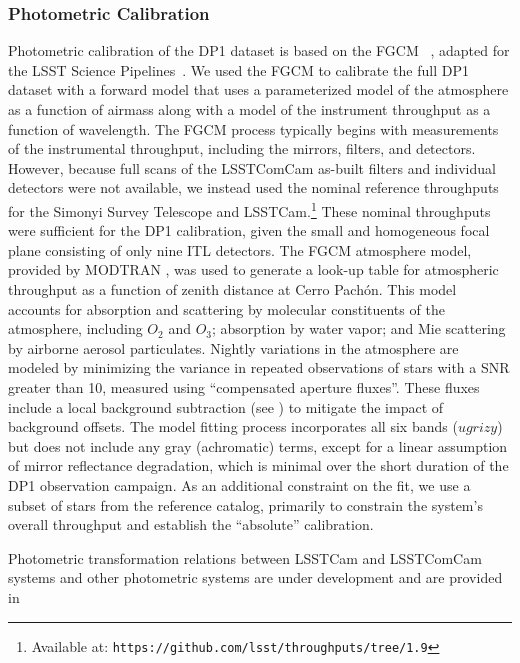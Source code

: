 \subsubsection{Photometric Calibration}
\label{photometric_calibration}
Photometric \gls{calibration} of the \gls{DP1} dataset is based on the \gls{FGCM} ~\citep[][]{2018AJ....155...41B}, adapted for the LSST Science Pipelines~\citep[][]{2022PASJ...74..247A, SITCOMTN-086}.
We used the \gls{FGCM} to calibrate the full \gls{DP1} dataset with a forward model that uses a parameterized model of the atmosphere as a function of airmass along with a model of the instrument throughput as a function of wavelength.
The FGCM process typically begins with measurements of the instrumental throughput, including the mirrors, filters, and detectors.
However, because full scans of the \gls{LSSTComCam} as-built filters and individual detectors were not available, we instead used the nominal reference throughputs for the Simonyi Survey Telescope and LSSTCam.\footnote{Available at: \nolinkurl{https://github.com/lsst/throughputs/tree/1.9}}
These nominal throughputs were sufficient for the \gls{DP1} calibration, given the small and homogeneous focal plane consisting of only nine \gls{ITL} detectors.
The FGCM atmosphere model, provided by MODTRAN \citep[][]{1999SPIE.3756..348B}, was used to generate a look-up table for atmospheric throughput as a function of zenith distance at Cerro Pachón.
This model accounts for absorption and scattering by molecular constituents of the atmosphere, including $O_2$ and $O_3$; absorption by water vapor; and Mie scattering by airborne aerosol particulates.
Nightly variations in the atmosphere are modeled by minimizing the variance in repeated observations of stars with a \gls{SNR} greater than 10, measured using ``compensated aperture fluxes''.
These fluxes include a local \gls{background} subtraction (see ) to mitigate the impact of \gls{background} offsets.
The model fitting process incorporates all six bands ($ugrizy$) but does not include any gray (achromatic) terms, except for a linear assumption of mirror reflectance degradation, which is minimal over the short duration of the \gls{DP1} observation campaign.
As an additional constraint on the fit, we use a subset of stars from the reference catalog\citep[][]{DMTN-277}, primarily to constrain the system's overall throughput and establish the ``absolute'' calibration.

Photometric transformation relations between \gls{LSSTCam} and \gls{LSSTComCam} systems and other photometric systems are under development and are provided  in \citep[][]{RTN-099}

